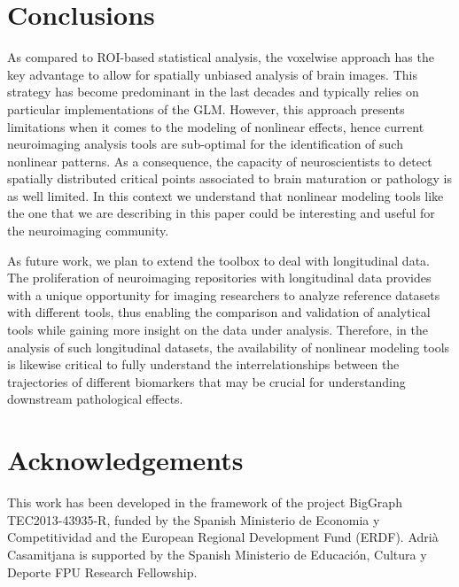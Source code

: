\documentclass{article}
\begin{document}
\section{Conclusions}

As compared to ROI-based statistical analysis, the voxelwise approach has the key advantage to allow for spatially unbiased analysis of brain images. This strategy has become predominant in the last decades and typically relies on particular implementations of the GLM. However, this approach presents limitations when it comes to the modeling of nonlinear effects, hence current neuroimaging analysis tools are sub-optimal for the identification of such nonlinear patterns. As a consequence, the capacity of neuroscientists to detect spatially distributed critical points associated to brain maturation or pathology is as well limited. In this context we understand that nonlinear modeling tools like the one that we are describing in this paper could be interesting and useful for the neuroimaging community. 

As future work, we plan to extend the toolbox to deal with longitudinal data. The proliferation of neuroimaging repositories with longitudinal data provides with a unique opportunity for imaging researchers to analyze reference datasets with different tools, thus enabling the comparison and validation of analytical tools while gaining more insight on the data under analysis. Therefore, in the analysis of such longitudinal datasets, the availability of nonlinear modeling tools is likewise critical to fully understand the interrelationships between the trajectories of different biomarkers that may be crucial for understanding downstream pathological effects.



\section*{Acknowledgements}
This work has been developed in the framework of the project BigGraph TEC2013-43935-R, funded by the Spanish Ministerio de Economia y Competitividad and the European Regional Development Fund (ERDF). Adrià Casamitjana is supported by the
Spanish Ministerio de Educación, Cultura y Deporte FPU Research Fellowship.

\small

\nocite{statistics_Hastie_2009}
\nocite{tutorial_SVR}



\end{document}
